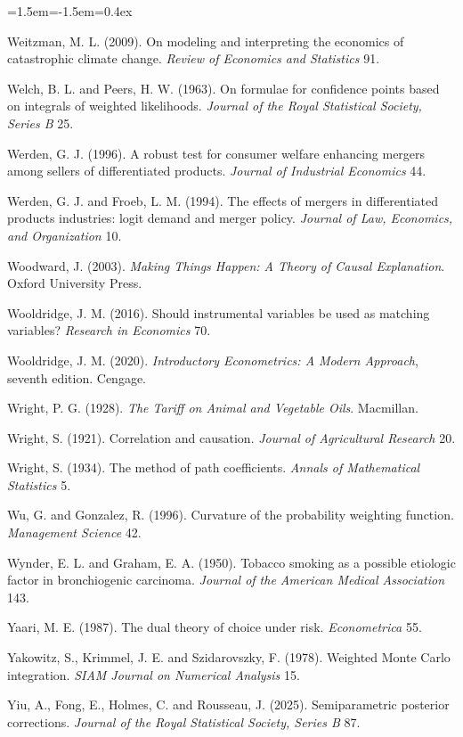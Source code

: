 \begin{list}{}{\leftmargin=1.5em\itemindent=-1.5em\itemsep=0.4ex}
\item Weitzman, M. L. (2009). On modeling and interpreting the economics of catastrophic climate change. \emph{Review of Economics and Statistics} 91.
\item Welch, B. L. and Peers, H. W. (1963). On formulae for confidence points based on integrals of weighted likelihoods. \emph{Journal of the Royal Statistical Society, Series B} 25.
\item Werden, G. J. (1996). A robust test for consumer welfare enhancing mergers among sellers of differentiated products. \emph{Journal of Industrial Economics} 44.
\item Werden, G. J. and Froeb, L. M. (1994). The effects of mergers in differentiated products industries: logit demand and merger policy. \emph{Journal of Law, Economics, and Organization} 10.
\item Woodward, J. (2003). \emph{Making Things Happen: A Theory of Causal Explanation}. Oxford University Press.
\item Wooldridge, J. M. (2016). Should instrumental variables be used as matching variables? \emph{Research in Economics} 70.
\item Wooldridge, J. M. (2020). \emph{Introductory Econometrics: A Modern Approach}, seventh edition. Cengage.
\item Wright, P. G. (1928). \emph{The Tariff on Animal and Vegetable Oils}. Macmillan.
\item Wright, S. (1921). Correlation and causation. \emph{Journal of Agricultural Research} 20.
\item Wright, S. (1934). The method of path coefficients. \emph{Annals of Mathematical Statistics} 5.
\item Wu, G. and Gonzalez, R. (1996). Curvature of the probability weighting function. \emph{Management Science} 42.
\item Wynder, E. L. and Graham, E. A. (1950). Tobacco smoking as a possible etiologic factor in bronchiogenic carcinoma. \emph{Journal of the American Medical Association} 143.
\item Yaari, M. E. (1987). The dual theory of choice under risk. \emph{Econometrica} 55.
\item Yakowitz, S., Krimmel, J. E. and Szidarovszky, F. (1978). Weighted Monte Carlo integration. \emph{SIAM Journal on Numerical Analysis} 15.
\item Yiu, A., Fong, E., Holmes, C. and Rousseau, J. (2025). Semiparametric posterior corrections. \emph{Journal of the Royal Statistical Society, Series B} 87.

\end{list}
